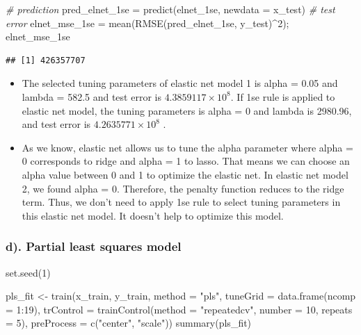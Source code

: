 \documentclass[
]{article}
\newenvironment{Shaded}{\begin{snugshade}}{\end{snugshade}}
\newcommand{\AttributeTok}[1]{\textcolor[rgb]{0.77,0.63,0.00}{#1}}
\newcommand{\CommentTok}[1]{\textcolor[rgb]{0.56,0.35,0.01}{\textit{#1}}}
\newcommand{\DecValTok}[1]{\textcolor[rgb]{0.00,0.00,0.81}{#1}}
\newcommand{\FunctionTok}[1]{\textcolor[rgb]{0.00,0.00,0.00}{#1}}
\newcommand{\NormalTok}[1]{#1}
\newcommand{\OtherTok}[1]{\textcolor[rgb]{0.56,0.35,0.01}{#1}}
\newcommand{\SpecialCharTok}[1]{\textcolor[rgb]{0.00,0.00,0.00}{#1}}
\newcommand{\StringTok}[1]{\textcolor[rgb]{0.31,0.60,0.02}{#1}}
\begin{document}
\begin{Shaded}
\begin{Highlighting}[]
\CommentTok{\# prediction}
\NormalTok{pred\_elnet\_1se }\OtherTok{=} \FunctionTok{predict}\NormalTok{(elnet\_1se, }\AttributeTok{newdata =}\NormalTok{ x\_test)}
\CommentTok{\# test error}
\NormalTok{elnet\_mse\_1se }\OtherTok{=} \FunctionTok{mean}\NormalTok{(}\FunctionTok{RMSE}\NormalTok{(pred\_elnet\_1se, y\_test)}\SpecialCharTok{\^{}}\DecValTok{2}\NormalTok{); elnet\_mse\_1se}
\end{Highlighting}
\end{Shaded}

\begin{verbatim}
## [1] 426357707
\end{verbatim}

\begin{itemize}
\item
  The selected tuning parameters of elastic net model 1 is alpha = 0.05
  and lambda = 582.5 and test error is
  \ensuremath{4.3859117\times 10^{8}}. If 1se rule is applied to elastic
  net model, the tuning parameters is alpha = 0 and lambda is 2980.96,
  and test error is \ensuremath{4.2635771\times 10^{8}} .
\item
  As we know, elastic net allows us to tune the alpha parameter where
  alpha = 0 corresponds to ridge and alpha = 1 to lasso. That means we
  can choose an alpha value between 0 and 1 to optimize the elastic net.
  In elastic net model 2, we found alpha = 0. Therefore, the penalty
  function reduces to the ridge term. Thus, we don't need to apply 1se
  rule to select tuning parameters in this elastic net model. It doesn't
  help to optimize this model.
\end{itemize}

\hypertarget{d.-partial-least-squares-model}{%
\subsubsection{d). Partial least squares
model}\label{d.-partial-least-squares-model}}

\begin{Shaded}
\begin{Highlighting}[]
\FunctionTok{set.seed}\NormalTok{(}\DecValTok{1}\NormalTok{)}

\NormalTok{pls\_fit }\OtherTok{\textless{}{-}} \FunctionTok{train}\NormalTok{(x\_train, y\_train,}
                 \AttributeTok{method =} \StringTok{"pls"}\NormalTok{,}
                 \AttributeTok{tuneGrid =} \FunctionTok{data.frame}\NormalTok{(}\AttributeTok{ncomp =} \DecValTok{1}\SpecialCharTok{:}\DecValTok{19}\NormalTok{),}
                 \AttributeTok{trControl =}  \FunctionTok{trainControl}\NormalTok{(}\AttributeTok{method =} \StringTok{"repeatedcv"}\NormalTok{, }\AttributeTok{number =} \DecValTok{10}\NormalTok{, }\AttributeTok{repeats =} \DecValTok{5}\NormalTok{),}
                 \AttributeTok{preProcess =} \FunctionTok{c}\NormalTok{(}\StringTok{"center"}\NormalTok{, }\StringTok{"scale"}\NormalTok{))}
\FunctionTok{summary}\NormalTok{(pls\_fit)}
\end{Highlighting}
\end{Shaded}
\end{document}
